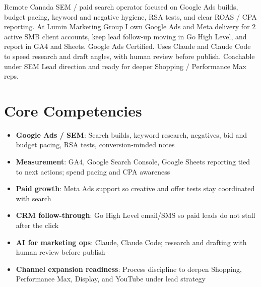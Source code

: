 \documentclass[11pt,a4paper,sans]{moderncv}
\begin{document}
\makecvtitle

\vspace{6pt}
\small{Remote Canada SEM / paid search operator focused on Google Ads builds, budget pacing, keyword and negative hygiene, RSA tests, and clear ROAS / CPA reporting. At Lumin Marketing Group I own Google Ads and Meta delivery for 2 active SMB client accounts, keep lead follow-up moving in Go High Level, and report in GA4 and Sheets. Google Ads Certified. Uses Claude and Claude Code to speed research and draft angles, with human review before publish. Coachable under SEM Lead direction and ready for deeper Shopping / Performance Max reps.}

\section{Core Competencies}
\vspace{1pt}
\begin{itemize}
\item \textbf{Google Ads / SEM}: Search builds, keyword research, negatives, bid and budget pacing, RSA tests, conversion-minded notes
\item \textbf{Measurement}: GA4, Google Search Console, Google Sheets reporting tied to next actions; spend pacing and CPA awareness
\item \textbf{Paid growth}: Meta Ads support so creative and offer tests stay coordinated with search
\item \textbf{CRM follow-through}: Go High Level email/SMS so paid leads do not stall after the click
\item \textbf{AI for marketing ops}: Claude, Claude Code; research and drafting with human review before publish
\item \textbf{Channel expansion readiness}: Process discipline to deepen Shopping, Performance Max, Display, and YouTube under lead strategy
\end{itemize}
\end{document}
